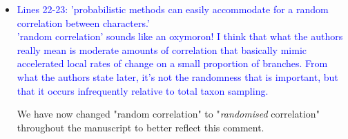 \documentclass[12pt,letterpaper]{article}
\begin{document}
\begin{itemize}

\item{\textcolor{blue}{Lines 22-23: 'probabilistic methods can easily accommodate for a random correlation between characters.'
\\
'random correlation' sounds like an oxymoron! I think that what the authors really mean is moderate amounts of correlation that basically mimic accelerated local rates of change on a small proportion of branches. From what the authors state later, it's not the randomness that is important, but that it occurs infrequently relative to total taxon sampling.}}

We have now changed "random correlation" to "\textit{randomised} correlation" throughout the manuscript to better reflect this comment.




\end{itemize}
\end{document}
